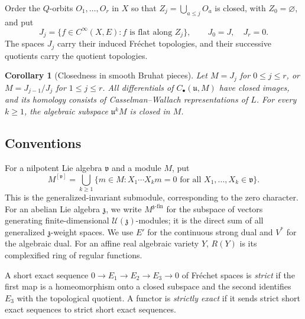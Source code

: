 \documentclass[a4paper,12pt]{amsart}
\numberwithin{equation}{section}
\theoremstyle{plain}
\newtheorem{corollary}[theorem]{Corollary}
\theoremstyle{definition}
\theoremstyle{remark}
\begin{document}
Order the $Q$-orbits $O_1,\ldots,O_r$ in $X$ so that $Z_j=\bigcup_{a\leq j}O_a$ is closed, with $Z_0=\varnothing$, and put
\[
 J_j=\{f\in C^\infty(X,E):f\text{ is flat along }Z_j\},
 \qquad J_0=J,\quad J_r=0.
\]
The spaces $J_j$ carry their induced Fr\'echet topologies, and their successive quotients carry the quotient topologies.

\begin{corollary}[Closedness in smooth Bruhat pieces]\label{C:Bruhat-piece-closedness}
Let $M=J_j$ for $0\leq j\leq r$, or $M=J_{j-1}/J_j$ for $1\leq j\leq r$.
All differentials of $C_\bullet(\mathfrak u,M)$ have closed images, and its homology consists of Casselman--Wallach representations of $L$.
For every $k\geq1$, the algebraic subspace $\mathfrak u^kM$ is closed in $M$.
\end{corollary}

\subsection*{Conventions}
For a nilpotent Lie algebra $\mathfrak v$ and a module $M$, put
\[
 M^{[\mathfrak v]}=\bigcup_{k\geq1}
 \{m\in M:X_1\cdots X_km=0
       \text{ for all }X_1,\ldots,X_k\in\mathfrak v\}.
\]
This is the generalized-invariant submodule, corresponding to the zero character.
For an abelian Lie algebra $\mathfrak z$, we write $M^{\mathfrak z\text{-fin}}$ for the subspace of vectors generating finite-dimensional $\mathcal U(\mathfrak z)$-modules; it is the direct sum of all generalized $\mathfrak z$-weight spaces.
We use $E'$ for the continuous strong dual and $V^*$ for the algebraic dual.
For an affine real algebraic variety $Y$, $R(Y)$ is its complexified ring of regular functions.

A short exact sequence $0\to E_1\to E_2\to E_3\to0$ of Fr\'echet spaces is \emph{strict} if the first map is a homeomorphism onto a closed subspace and the second identifies $E_3$ with the topological quotient.
A functor is \emph{strictly exact} if it sends strict short exact sequences to strict short exact sequences.
\end{document}
